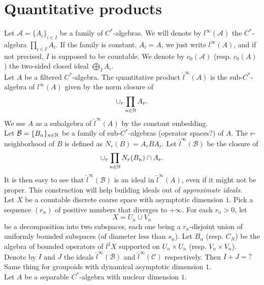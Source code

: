 \section{Quantitative products}

Let $\mathcal A=\{ A_i \}_{i\in I}$ be a family of $C^*$-algebras. We will denote by $l^\infty (\mathcal A)$ the $C^*$-algebra $\prod_{i\in I} A_i$. If the family is constant, $A_i=A$, we just write $l^\infty (A)$, and if not precised, $I $ is supposed to be countable. We denote by $c_0(\mathcal A)$ (resp. $c_0(A)$) the two-sided closed ideal $\bigoplus_I A_i$.\\

Let $A$ be a filtered $C^*$-algebra. The quantitative product $\hat l^\infty(A)$ is the sub-$C^*$-algebra of $l^\infty(A)$ given by the norm closure of  
\[ \cup_r \prod_{n\in \mathbb N} A_r. \]
We see $A$ as a subalgebra of $\hat l^\infty (A)$ by the constant embedding.\\

Let $\mathcal B =\{ B_n \}_{n\in \mathbb N}$ be a family of sub-$C^*$-algebras (operator spaces?) of $A$. The $r$-neighborhood of $B$ is defined as $N_r(B)=A_r B A_r$. Let $\hat l^\infty (\mathcal B)$ be the closure of
\[\cup_r \prod_{n\in\mathbb N} N_r(B_n) \cap A_r. \]
It is then easy to see that $\hat l^\infty (\mathcal B)$ is an ideal in $\hat l^\infty (A)$, even if it might not be proper. This construction will help building ideals out of \textit{approximate ideals}.\\

Let $X$ be a countable discrete coarse space with asymptotic dimension $1$. Pick a sequence $(r_n)$ of positive numbers that diverges to $+\infty$. For each $r_n>0$, let 
\[X = U_n \cup V_n\]
be a decomposition into two subspaces, each one being a $r_n$-disjoint union of uniformly bounded subspaces (of diameter less than $s_n$). Let $B_n$ (resp. $C_N$) be the algebra of bounded operators of $l^2 X$ supported on $U_n\times U_n$ (resp. $V_n\times V_n$). Denote by $I$ and $J$ the ideals $\hat l^\infty (\mathcal B)$ and $\hat l^\infty (\mathcal C)$ respectively. Then $I+J = ?$\\

Same thing for groupoids with dynamical asymptotic dimension $1$.\\

Let $A$ be a separable $C^*$-algebra with nuclear dimension $1$. 
